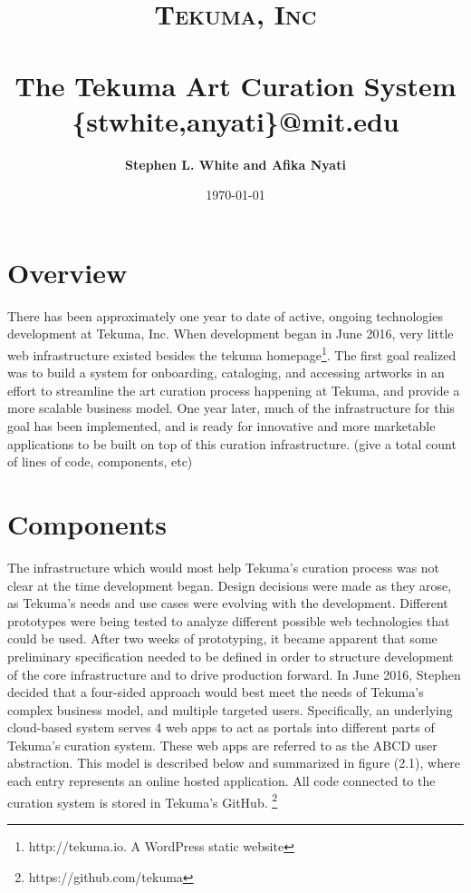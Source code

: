 \documentclass[fontsize=12pt]{scrartcl} %
\title{
\normalfont \normalsize
\textsc{Tekuma, Inc} \\[6pt]
\horrule{0.2pt} \\[10pt] %
\Huge The Tekuma Art Curation System  %
\horrule{1.5pt}  %
\normalsize \{stwhite,anyati\}@mit.edu
}
\author{\textbf{Stephen L. White and Afika Nyati}}
\date{\normalsize \today} %
\numberwithin{equation}{section} %
\numberwithin{figure}{section} %
\numberwithin{table}{section} %
\begin{document}
\maketitle %

\section{Overview}
There has been approximately one year to date of active, ongoing technologies development at Tekuma, Inc. When development began in June 2016, very little web infrastructure existed besides the tekuma homepage\footnote{http://tekuma.io. A WordPress static website}. The first goal realized was to build a system for onboarding, cataloging, and accessing artworks in an effort to streamline the art curation process happening at Tekuma, and provide a more scalable business model. One year later, much of the infrastructure for this goal has been implemented, and is ready for innovative and more marketable applications to be built on top of this curation infrastructure. (give a total count of lines of code, components, etc)

\section{Components}
The infrastructure which would most help Tekuma’s curation process was not clear at the time development began. Design decisions were made as they arose, as Tekuma's needs and use cases were evolving with the development. Different prototypes were being tested to analyze different possible web technologies that could be used. After two weeks of prototyping, it became apparent that some preliminary specification needed to be defined in order to structure development of the core infrastructure and to drive production forward. In June 2016, Stephen decided that a four-sided approach would best meet the needs of Tekuma’s complex business model, and multiple targeted users. Specifically, an underlying cloud-based system serves 4 web apps to act as portals into different parts of Tekuma's curation system. These web apps are referred to as the ABCD user abstraction. This model is described below and summarized in figure (2.1), where each entry represents an online hosted application. All code connected to the curation system is stored in Tekuma's GitHub. \footnote{https://github.com/tekuma}
\end{document}
